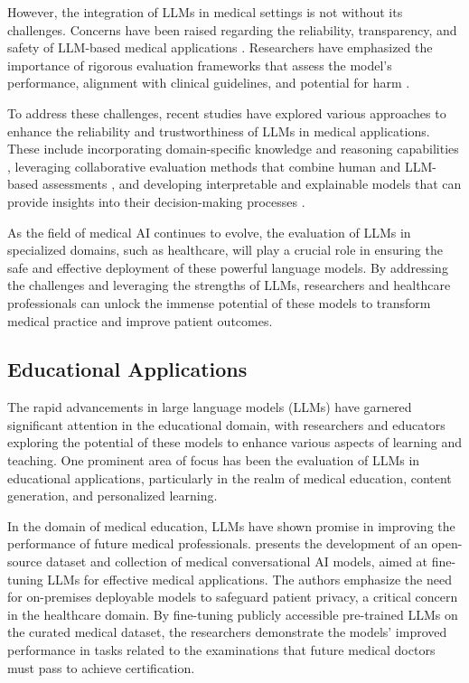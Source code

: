 \documentclass[11pt]{article}
\begin{document}
However, the integration of LLMs in medical settings is not without its challenges. Concerns have been raised regarding the reliability, transparency, and safety of LLM-based medical applications \cite{ref35}. Researchers have emphasized the importance of rigorous evaluation frameworks that assess the model's performance, alignment with clinical guidelines, and potential for harm \cite{ref216}.

To address these challenges, recent studies have explored various approaches to enhance the reliability and trustworthiness of LLMs in medical applications. These include incorporating domain-specific knowledge and reasoning capabilities \cite{ref217,ref33}, leveraging collaborative evaluation methods that combine human and LLM-based assessments \cite{ref66}, and developing interpretable and explainable models that can provide insights into their decision-making processes \cite{ref218,ref219}.

As the field of medical AI continues to evolve, the evaluation of LLMs in specialized domains, such as healthcare, will play a crucial role in ensuring the safe and effective deployment of these powerful language models. By addressing the challenges and leveraging the strengths of LLMs, researchers and healthcare professionals can unlock the immense potential of these models to transform medical practice and improve patient outcomes.

\subsection{Educational Applications}

The rapid advancements in large language models (LLMs) have garnered significant attention in the educational domain, with researchers and educators exploring the potential of these models to enhance various aspects of learning and teaching. One prominent area of focus has been the evaluation of LLMs in educational applications, particularly in the realm of medical education, content generation, and personalized learning.

In the domain of medical education, LLMs have shown promise in improving the performance of future medical professionals. \cite{ref85} presents the development of an open-source dataset and collection of medical conversational AI models, aimed at fine-tuning LLMs for effective medical applications. The authors emphasize the need for on-premises deployable models to safeguard patient privacy, a critical concern in the healthcare domain. By fine-tuning publicly accessible pre-trained LLMs on the curated medical dataset, the researchers demonstrate the models' improved performance in tasks related to the examinations that future medical doctors must pass to achieve certification.
\end{document}
